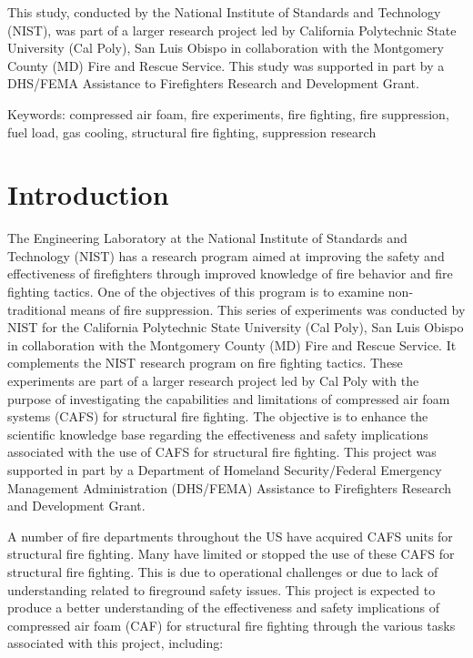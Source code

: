 \documentclass[12pt,oneside]{book}
\begin{document}
This study, conducted by the National Institute of Standards and Technology (NIST), was part of a larger research project led by California Polytechnic State University (Cal Poly), San Luis Obispo in collaboration with the Montgomery County (MD) Fire and Rescue Service.  This study was supported in part by a DHS/FEMA Assistance to Firefighters Research and Development Grant.

\vspace{0.5in}
Keywords: compressed air foam, fire experiments, fire fighting, fire suppression, fuel load, gas cooling, structural fire fighting, suppression research  


\chapter{Introduction}
\label{chap:Introduction}
\setcounter{page}{1}

The Engineering Laboratory at the National Institute of Standards and Technology (NIST) has a research program aimed at improving the safety and effectiveness of firefighters through improved knowledge of fire behavior and fire fighting tactics. One of the objectives of this program is to examine non-traditional means of fire suppression. This series of experiments was conducted by NIST for the California Polytechnic State University (Cal Poly), San Luis Obispo in collaboration with the Montgomery County (MD) Fire and Rescue Service. It complements the NIST research program on fire fighting tactics. These experiments are part of a larger research project led by Cal Poly with the purpose of investigating the capabilities and limitations of compressed air foam systems (CAFS) for structural fire fighting. The objective is to enhance the scientific knowledge base regarding the effectiveness and safety implications associated with the use of CAFS for structural fire fighting. This project was supported in part by a Department of Homeland Security/Federal Emergency Management Administration (DHS/FEMA) Assistance to Firefighters Research and Development Grant.

A number of fire departments throughout the US have acquired CAFS units for structural fire fighting. Many have limited or stopped the use of these CAFS for structural fire fighting. This is due to operational challenges or due to lack of understanding related to fireground safety issues. This project is expected to produce a better understanding of the effectiveness and safety implications of compressed air foam (CAF) for structural fire fighting through the various tasks associated with this project, including: 
\end{document}
